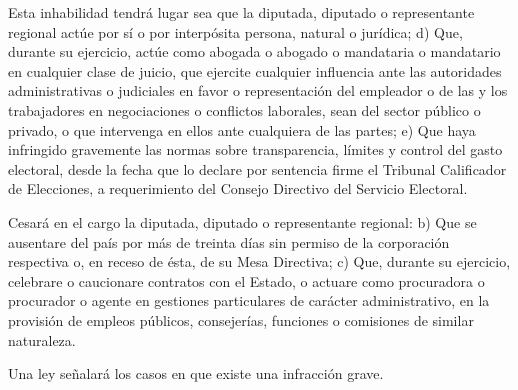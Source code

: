 \documentclass[11pt, a4paper]{article}
\begin{document}
\begin{enumerate}
Esta inhabilidad tendrá lugar sea que la diputada, diputado o representante regional actúe por sí o por interpósita persona, natural o jurídica; d) Que, durante su ejercicio, actúe como abogada o abogado o mandataria o mandatario en cualquier clase de juicio, que ejercite cualquier influencia ante las autoridades administrativas o judiciales en favor o representación del empleador o de las y los trabajadores en negociaciones o conflictos laborales, sean del sector público o privado, o que intervenga en ellos ante cualquiera de las partes; e) Que haya infringido gravemente las normas sobre transparencia, límites y control del gasto electoral, desde la fecha que lo declare por sentencia firme el Tribunal Calificador de Elecciones, a requerimiento del Consejo Directivo del Servicio Electoral. 

Cesará en el cargo la diputada, diputado o representante regional: b) Que se ausentare del país por más de treinta días sin permiso de la corporación respectiva o, en receso de ésta, de su Mesa Directiva; c) Que, durante su ejercicio, celebrare o caucionare contratos con el Estado, o actuare como procuradora o procurador o agente en gestiones particulares de carácter administrativo, en la provisión de empleos públicos, consejerías, funciones o comisiones de similar naturaleza. 

Una ley señalará los casos en que existe una infracción grave. 



\end{enumerate}
\end{document}
